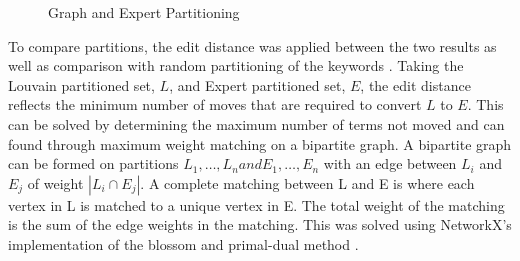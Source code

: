\documentclass[a4paper, 11pt]{article}
\begin{document}
\begin{figure}[t]

  \hfill{}
  \hfill{}
  \hfill{}
  
  \caption{Graph and Expert Partitioning}
\end{figure}

To compare partitions, the edit distance was applied between the two results as well as comparison with random partitioning of the keywords \parencite{deibel2005}.
Taking the Louvain partitioned set, $L$, and Expert partitioned set, $E$, the edit distance reflects the minimum number of moves that are required to convert $L$ to $E$.
This can be solved by determining the maximum number of terms not moved and can found through maximum weight matching on a bipartite graph.
A bipartite graph can be formed on partitions $L_1,\ldots,L_n and E_1,\ldots,E_n$  with an edge between $L_i$ and $E_j$ of weight $\left|L_i\cap E_j\right|$.
A complete matching between L and E is where each vertex in L is matched to a unique vertex in E. The total weight of the matching is the sum of the edge weights in the matching.
This was solved using NetworkX's implementation of the blossom and primal-dual method \parencite{galil1986}.
\end{document}
